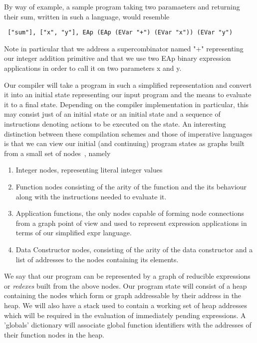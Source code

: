 \noindent By way of example, a sample program taking two paramaeters and returning
their sum, written in such a language, would resemble

\begin{verbatim}
 ["sum"], ["x", "y"], EAp (EAp (EVar "+") (EVar "x")) (EVar "y")
\end{verbatim}


\noindent Note in particular that we address a supercombinator named "+" 
representing our integer addition primitive and that we use two EAp 
binary expression applications in order to call it on two parameters x and y.

Our compiler will take a program in such a simplified representation
and convert it into an initial state representing our input program and the
means to evaluate it to a final state. Depending on the compiler implementation
in particular, this may consist just of an initial state or an initial state
and a sequence of instructions denoting actions to be executed on the state. 
An interesting 
distinction between these compilation schemes and those of imperative languages
is that we can view our initial (and continuing) program states as graphs built
from a small set of nodes~\cite[pp.185]{SPJ}, namely

\begin{enumerate}
	\item Integer nodes, representing literal integer values
	\item Function nodes consisting of the arity of the function and the
		  its behaviour along with the instructions needed to evaluate it.
	\item Application functions, the only nodes capable of forming 
		  node connections from a graph point of view and used to represent
		  expression applications in terms of our simplified expr language.
	\item Data Constructor nodes, consisting of the arity of the data
		  constructor and a list of addresses to the nodes containing its
		  elements.
\end{enumerate}

We say that our program can be represented by a graph of reducible expressions
or \emph{redexes} built from the above nodes. 
Our program state will consist of a heap containing the nodes which form
or graph addressable by their address in the heap. We will
also have a stack used to contain a working set of heap addresses which 
will be required in the evaluation of immediately pending expressions. A 
'globals' dictionary will associate global function identifiers with the
addresses of their function nodes in the heap. \\

